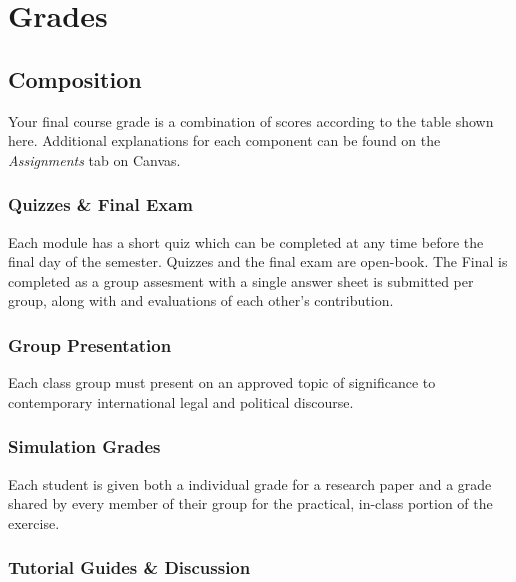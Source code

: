 \documentclass[10pt,]{article}
\begin{document}
\newpage

\hypertarget{grades}{%
\section{Grades}\label{grades}}

\hypertarget{composition}{%
\subsection{Composition}\label{composition}}

Your final course grade is a combination of scores according to the
table shown here. Additional explanations for each component can be
found on the \emph{Assignments} tab on Canvas.

\hypertarget{quizzes-final-exam}{%
\subsubsection{Quizzes \& Final Exam}\label{quizzes-final-exam}}

Each module has a short quiz which can be completed at any time before
the final day of the semester. Quizzes and the final exam are open-book.
The Final is completed as a group assesment with a single answer sheet
is submitted per group, along with and evaluations of each other's
contribution.

\hypertarget{group-presentation}{%
\subsubsection{Group Presentation}\label{group-presentation}}

Each class group must present on an approved topic of significance to
contemporary international legal and political discourse.

\hypertarget{simulation-grades}{%
\subsubsection{Simulation Grades}\label{simulation-grades}}

Each student is given both a individual grade for a research paper and a
grade shared by every member of their group for the practical, in-class
portion of the exercise.

\hypertarget{tutorial-guides-discussion}{%
\subsubsection{Tutorial Guides \&
Discussion}\label{tutorial-guides-discussion}}
\end{document}
